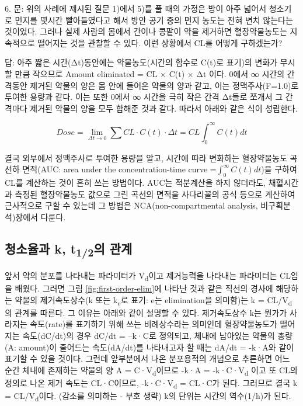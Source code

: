 \documentclass[
  11pt,
  krantz2, a4paper, twoside]{krantz}
\makeatletter
\newenvironment{kframe}{%
\medskip{}
\setlength{\fboxsep}{.8em}
 \def\at@end@of@kframe{}%
 \ifinner\ifhmode%
  \def\at@end@of@kframe{\end{minipage}}%
  \begin{minipage}{\columnwidth}%
 \fi\fi%
 \def\FrameCommand##1{\hskip\@totalleftmargin \hskip-\fboxsep
 \colorbox{shadecolor}{##1}\hskip-\fboxsep
     \hskip-\linewidth \hskip-\@totalleftmargin \hskip\columnwidth}%
 \MakeFramed {\advance\hsize-\width
   \@totalleftmargin\z@ \linewidth\hsize
   \@setminipage}}%
 {\par\unskip\endMakeFramed%
 \at@end@of@kframe}
\newenvironment{rmdblock}[1]
  {
  \begin{itemize}
  \renewcommand{\labelitemi}{
    \raisebox{-.7\height}[0pt][0pt]{
      {\setkeys{Gin}{width=3em,keepaspectratio}\texttt{[image: images/\#1]}}
    }
  }
  \setlength{\fboxsep}{1em}
  \begin{kframe}
  \item
  }
  {
  \end{kframe}
  \end{itemize}
  }
\newenvironment{rmdtip}
  {\begin{rmdblock}{tip}}
  {\end{rmdblock}}
\theoremstyle{definition}
\theoremstyle{definition}
\theoremstyle{definition}
\theoremstyle{definition}
\theoremstyle{remark}
\makeatother
\begin{document}
\begin{rmdtip}
6. 문: 위의 사례에 제시된 질문 1)에서 5)를 풀 때의 가정은 방이 아주 넓어서 청소기로 먼지를 몇시간 빨아들였다고 해서 방안 공기 중의 먼지 농도는 전혀 변치 않는다는 것이었다. 그러나 실제 사람의 몸에서 간이나 콩팥이 약을 제거하면 혈장약물농도는 지속적으로 떨어지는 것을 관찰할 수 있다. 이런 상황에서 CL를 어떻게 구하겠는가?

답: 아주 짧은 시간(Δt)동안에는 약물농도(시간의 함수로 C(t)로 표기)의
변화가 무시할 만큼 작으므로 Amount eliminated = CL × C(t) × Δt 이다.
0에서 ∞ 시간의 간격동안 제거된 약물의 양은 몸 안에 들어온 약물의 양과
같고, 이는 정맥주사(F=1.0)로 투여한 용량과 같다. 이는 또한 0에서 ∞
시간을 극히 작은 간격 Δt들로 쪼개서 그 간격마다 제거된 약물의 양을
모두 합해준 것과 같다. 따라서 아래와 같은 식이 성립한다.

\[
Dose = \lim_{\Delta t \rightarrow 0}{\sum_{}^{}{CL \cdot C\left( t \right) \cdot \Delta t = CL\int_{0}^{\infty}{C\left( t \right)dt}}}
\]

결국 외부에서 정맥주사로 투여한 용량을 알고, 시간에 따라 변화하는 혈장약물농도 곡선하 면적(AUC: area under the concentration-time curve =\(\int_{0}^{\infty}{C\left( t \right){dt}}\))을 구하여 CL를 계산하는 것이 흔히 쓰는 방법이다.
AUC는 적분계산을 하지 않더라도, 채혈시간과 측정된 혈장약물농도 값으로 그린 곡선의 면적을 사다리꼴의 공식 등으로 계산하여 근사적으로 구할 수 있는데 그 방법은 NCA(non-compartmental analysis, 비구획분석)장에서 다룬다.
\end{rmdtip}

\subsection{\texorpdfstring{청소율과 k, t\textsubscript{1/2}의 관계}{청소율과 k, t1/2의 관계}}\label{uxccaduxc18cuxc728uxacfc-k-t12uxc758-uxad00uxacc4}

앞서 약의 분포를 나타내는 파라미터가 V\textsubscript{d}이고 제거능력을 나타내는 파라미터는 CL임을 배웠다.
그러면 그림 \ref{fig:first-order-elim}에 나타난 것과 같은 직선의 경사에 해당하는 약물의 제거속도상수(k 또는 k\textsubscript{e}로 표기: e는 elimination을 의미함)는 k = CL/V\textsubscript{d}의 관계를 따른다.
그 이유는 아래와 같이 설명할 수 있다.
제거속도상수 k는 뭔가가 사라지는 속도(rate)를 표기하기 위해 쓰는 비례상수라는 의미인데 혈장약물농도가 떨어지는 속도(dC/dt)의 경우 dC/dt = --k·C로 정의되고, 체내에 남아있는 약물의 총량(A: amount)이 줄어드는 속도(dA/dt)를 나타내고자 할 때는 dA/dt = -k·A와 같이 표기할 수 있을 것이다. 그런데 앞부분에서 나온 분포용적의 개념으로 추론하면 어느 순간 체내에 존재하는 약물의 양 A = C·V\textsubscript{d}이므로 -k·A = -k·C·V\textsubscript{d} 이고 또 CL의 정의로 나온 제거 속도는 CL·C이므로, -k·C·V\textsubscript{d} = CL·C가 된다. 
그러므로 결국 k = CL/V\textsubscript{d}이다. (감소를 의미하는 - 부호 생략) k의 단위는 시간의 역수(1/h)가 된다.
\end{document}
